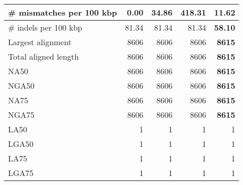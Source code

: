 \documentclass[12pt,a4paper]{article}
\begin{document}
\begin{table}[ht]
\begin{center}
\begin{tabular}{|l*{4}{|r}|}
\# mismatches per 100 kbp & {\bf 0.00} & 34.86 & 418.31 & 11.62 \\ \hline
\# indels per 100 kbp & 81.34 & 81.34 & 81.34 & {\bf 58.10} \\ \hline
Largest alignment & 8606 & 8606 & 8606 & {\bf 8615} \\ \hline
Total aligned length & 8606 & 8606 & 8606 & {\bf 8615} \\ \hline
NA50 & 8606 & 8606 & 8606 & {\bf 8615} \\ \hline
NGA50 & 8606 & 8606 & 8606 & {\bf 8615} \\ \hline
NA75 & 8606 & 8606 & 8606 & {\bf 8615} \\ \hline
NGA75 & 8606 & 8606 & 8606 & {\bf 8615} \\ \hline
LA50 & 1 & 1 & 1 & 1 \\ \hline
LGA50 & 1 & 1 & 1 & 1 \\ \hline
LA75 & 1 & 1 & 1 & 1 \\ \hline
LGA75 & 1 & 1 & 1 & 1 \\ \hline
\end{tabular}
\end{center}
\end{table}
\end{document}

